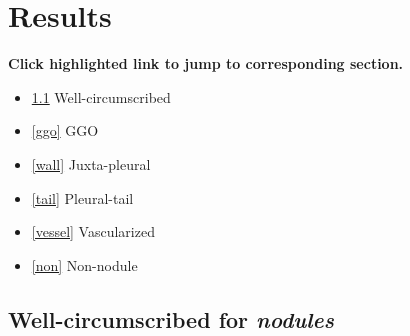 \documentclass[onecolumn]{IEEEtran}
\begin{document}
\section{Results}
\textbf{Click highlighted link to jump to corresponding section.}
\begin{itemize}
\item \ref{iso} Well-circumscribed
\item \ref{ggo} GGO
\item \ref{wall} Juxta-pleural
\item \ref{tail} Pleural-tail
\item \ref{vessel} Vascularized
\item \ref{non} Non-nodule
\end{itemize}


\newpage
\subsection{Well-circumscribed for \emph{nodules}}
\label{iso}
\end{document}
